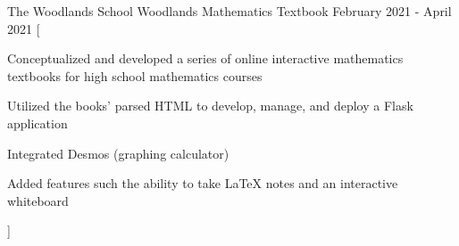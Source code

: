 

\begin{cventries}

  \cventry
    {The Woodlands School} %
    {Woodlands Mathematics Textbook} %
    {} %
    {February 2021 - April 2021} %
    [
      \begin{cvitems} %
        \item {Conceptualized and developed a series of online interactive mathematics textbooks for high school mathematics courses}
        \item {Utilized the books' parsed HTML to develop, manage, and deploy a Flask application}
        \item {Integrated Desmos (graphing calculator)}
        \item {Added features such the ability to take LaTeX notes and an interactive whiteboard}
      \end{cvitems}
    ]

\end{cventries}
